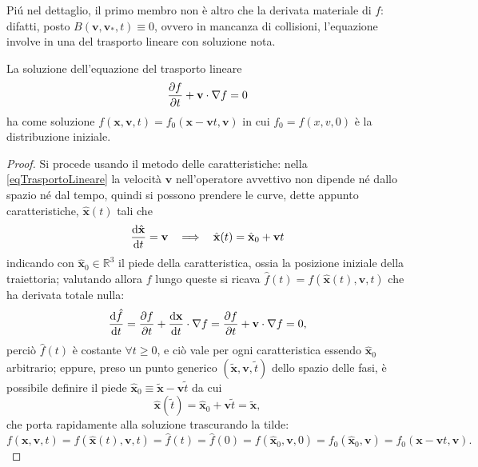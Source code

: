       Piú nel dettaglio, il primo membro non è altro che la derivata materiale di \(f\): difatti, posto \(B(\mathbf v,\mathbf v_*,t)\equiv0\), ovvero in mancanza di collisioni, l'equazione involve in una del trasporto lineare con soluzione nota.
      
      \begin{prp}
        La soluzione dell'equazione del trasporto lineare
        \begin{equation}
          \label{eqTrasportoLineare}
          \frac{\partial f}{\partial t}+\mathbf v\cdot\nabla f=0
        \end{equation}
        ha come soluzione \(f(\mathbf x,\mathbf v,t)=f_0(\mathbf x-\mathbf vt,\mathbf v)\) in cui \(f_0=f(x,v,0)\) è la distribuzione iniziale.
      \end{prp}

      \begin{proof}
        Si procede usando il metodo delle caratteristiche: nella \eqref{eqTrasportoLineare} la velocità \(\mathbf v\) nell'operatore avvettivo non dipende né dallo spazio né dal tempo, quindi si possono prendere le curve, dette appunto caratteristiche, \(\hat{\mathbf x}(t)\) tali che
        \begin{equation}
          \label{eqCurveCaratteristiche}
          \derS{\hat{\mathbf x}}t=\mathbf v
          \ \ \implies\ \ 
          \hat{\mathbf x}(t)=\hat{\mathbf x}_0+\mathbf vt
        \end{equation}
        indicando con \(\hat{\mathbf x}_0\in\mathbb R^3\) il piede della caratteristica, ossia la posizione iniziale della traiettoria; valutando allora \(f\) lungo queste si ricava \(\hat f(t)=f(\hat{\mathbf x}(t),\mathbf v,t)\) che ha derivata totale nulla:
        \[
          \frac{\mathrm{d}\hat f}{\mathrm{d}t}
          =\frac{\partial f}{\partial t}+\frac{\mathrm{d}\mathbf x}{\mathrm{d}t}\cdot\nabla f
          =\frac{\partial f}{\partial t}+\mathbf v\cdot\nabla f=0,
        \]
        perciò \(\hat f(t)\) è costante \(\forall t\geq0\), e ciò vale per ogni caratteristica essendo \(\hat{\mathbf x}_0\) arbitrario; eppure, preso un punto generico \((\tilde{\mathbf x},\mathbf v,\tilde t)\) dello spazio delle fasi, è possibile definire il piede \(\hat{\mathbf x}_0\equiv\tilde{\mathbf x}-\mathbf v\tilde t\) da cui
        \[
          \hat{\mathbf x}(\tilde t)
          =\hat{\mathbf x}_0+\mathbf v\tilde t
          =\tilde{\mathbf x},
        \]
        che porta rapidamente alla soluzione trascurando la tilde:
        \[
          f(\mathbf x,\mathbf v,t)
          =f(\hat{\mathbf x}(t),\mathbf v,t)
          =\hat f(t)=\hat f(0)
          =f(\hat{\mathbf x}_0,\mathbf v,0)
          =f_0(\hat{\mathbf x}_0,\mathbf v)
          =f_0(\mathbf x-\mathbf vt,\mathbf v).
        \]
      \end{proof}

